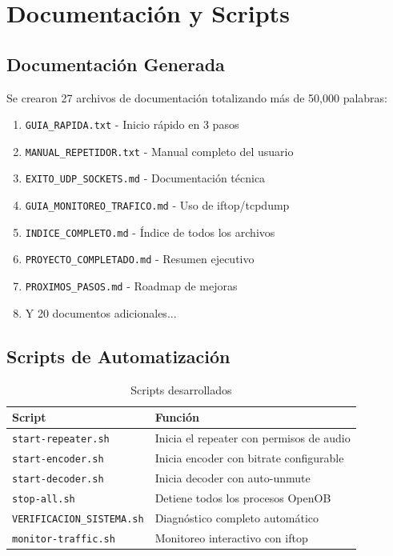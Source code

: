 \documentclass[12pt,a4paper]{article}
\begin{document}
\newpage

\section{Documentación y Scripts}

\subsection{Documentación Generada}

Se crearon 27 archivos de documentación totalizando más de 50,000 palabras:

\begin{enumerate}[itemsep=0.3em]
    \item \texttt{GUIA\_RAPIDA.txt} - Inicio rápido en 3 pasos
    \item \texttt{MANUAL\_REPETIDOR.txt} - Manual completo del usuario
    \item \texttt{EXITO\_UDP\_SOCKETS.md} - Documentación técnica
    \item \texttt{GUIA\_MONITOREO\_TRAFICO.md} - Uso de iftop/tcpdump
    \item \texttt{INDICE\_COMPLETO.md} - Índice de todos los archivos
    \item \texttt{PROYECTO\_COMPLETADO.md} - Resumen ejecutivo
    \item \texttt{PROXIMOS\_PASOS.md} - Roadmap de mejoras
    \item Y 20 documentos adicionales...
\end{enumerate}

\subsection{Scripts de Automatización}

\begin{table}[H]
\centering
\caption{Scripts desarrollados}
\label{tab:scripts}
\begin{tabular}{@{}lp{8cm}@{}}
\toprule
\textbf{Script} & \textbf{Función} \\ \midrule
\texttt{start-repeater.sh} & Inicia el repeater con permisos de audio \\
\texttt{start-encoder.sh} & Inicia encoder con bitrate configurable \\
\texttt{start-decoder.sh} & Inicia decoder con auto-unmute \\
\texttt{stop-all.sh} & Detiene todos los procesos OpenOB \\
\texttt{VERIFICACION\_SISTEMA.sh} & Diagnóstico completo automático \\
\texttt{monitor-traffic.sh} & Monitoreo interactivo con iftop \\
\bottomrule
\end{tabular}
\end{table}
\end{document}

